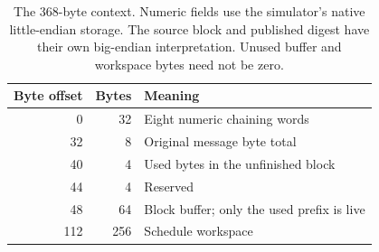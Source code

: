 \begin{table}[!ht]
  \centering
  \begin{tabular}{r r l}
    \toprule
    Byte offset & Bytes & Meaning                                    \\
    \midrule
    0           & 32    & Eight numeric chaining words               \\
    32          & 8     & Original message byte total                \\
    40          & 4     & Used bytes in the unfinished block         \\
    44          & 4     & Reserved                                   \\
    48          & 64    & Block buffer; only the used prefix is live \\
    112         & 256   & Schedule workspace                         \\
    \bottomrule
  \end{tabular}
  \caption{The 368-byte context. Numeric fields use the simulator's native little-endian storage. The source block and published digest have their own big-endian interpretation. Unused buffer and workspace bytes need not be zero.}
  \label{tab:revision-sha-context}
\end{table}
